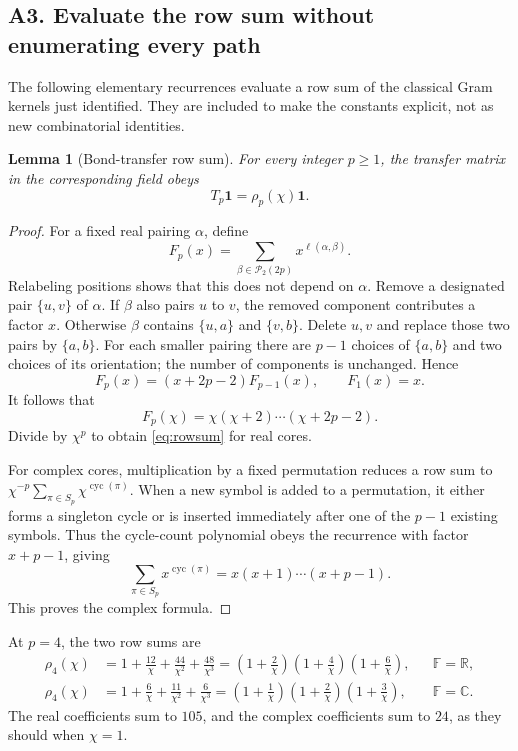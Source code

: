 \documentclass[11pt]{article}
\numberwithin{equation}{section}
\newtheorem{lemma}[theorem]{Lemma}
\theoremstyle{definition}\newtheorem{definition}[theorem]{Definition}
\theoremstyle{remark}\newtheorem{remark}[theorem]{Remark}
\newcommand{\R}{\mathbb R}\newcommand{\E}{\mathbb E}\newcommand{\Prob}{\mathbb P}
\newcommand{\one}{\mathbf1}\newcommand{\F}{\mathbb F}
\newcommand{\C}{\mathbb C}
\newcommand{\cyc}{\operatorname{cyc}}
\begin{document}
\subsection{A3. Evaluate the row sum without enumerating every path}
The following elementary recurrences evaluate a row sum of the classical
Gram kernels just identified. They are included to make the constants explicit,
not as new combinatorial identities.
\begin{lemma}[Bond-transfer row sum]\label{lem:rowsum}
For every integer $p\ge1$, the transfer matrix in the corresponding field obeys
\begin{equation}\label{eq:rowsum}
 T_p\one=\rho_p(\chi)\one.
\end{equation}
\end{lemma}
\begin{proof}
For a fixed real pairing $\alpha$, define
\[
 F_p(x)=\sum_{\beta\in\mathcal P_2(2p)}x^{\ell(\alpha,\beta)}.
\]
Relabeling positions shows that this does not depend on $\alpha$.
Remove a designated pair $\{u,v\}$ of $\alpha$.
If $\beta$ also pairs $u$ to $v$, the removed component contributes a factor $x$.
Otherwise $\beta$ contains $\{u,a\}$ and $\{v,b\}$.
Delete $u,v$ and replace those two pairs by $\{a,b\}$.
For each smaller pairing there are $p-1$ choices of $\{a,b\}$ and two choices
of its orientation; the number of components is unchanged. Hence
\[
 F_p(x)=(x+2p-2)F_{p-1}(x),\qquad F_1(x)=x.
\]
It follows that
\[
 F_p(\chi)=\chi(\chi+2)\cdots(\chi+2p-2).
\]
Divide by $\chi^p$ to obtain \eqref{eq:rowsum} for real cores.

For complex cores, multiplication by a fixed permutation reduces a row sum to
$\chi^{-p}\sum_{\pi\in S_p}\chi^{\cyc(\pi)}$.
When a new symbol is added to a permutation, it either forms a singleton cycle
or is inserted immediately after one of the $p-1$ existing symbols. Thus the
cycle-count polynomial obeys the recurrence with factor $x+p-1$, giving
\[
 \sum_{\pi\in S_p}x^{\cyc(\pi)}=x(x+1)\cdots(x+p-1).
\]
This proves the complex formula.
\end{proof}

At $p=4$, the two row sums are
\begin{align}
 \rho_4(\chi)&=1+\frac{12}{\chi}+\frac{44}{\chi^2}+\frac{48}{\chi^3}
 =\left(1+\frac2\chi\right)\left(1+\frac4\chi\right)
  \left(1+\frac6\chi\right),&&\F=\R,\label{eq:rho4R}\\
 \rho_4(\chi)&=1+\frac6\chi+\frac{11}{\chi^2}+\frac6{\chi^3}
 =\left(1+\frac1\chi\right)\left(1+\frac2\chi\right)
  \left(1+\frac3\chi\right),&&\F=\C.\label{eq:rho4C}
\end{align}
The real coefficients sum to $105$, and the complex coefficients sum to $24$,
as they should when $\chi=1$.
\end{document}
